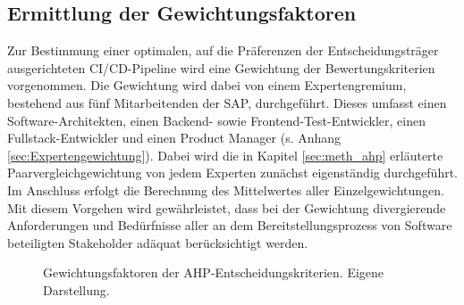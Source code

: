 \subsection{Ermittlung der Gewichtungsfaktoren}
\label{sec:Gewichtung}
Zur Bestimmung einer optimalen, auf die Präferenzen der Entscheidungsträger ausgerichteten CI/CD-Pipeline wird eine Gewichtung der Bewertungskriterien vorgenommen. Die Gewichtung wird dabei von einem Expertengremium, bestehend aus fünf Mitarbeitenden der SAP, durchgeführt. Dieses umfasst einen Software-Architekten, einen Backend- sowie Frontend-Test-Entwickler, einen Fullstack-Entwickler und einen Product Manager (s. Anhang \ref{sec:Expertengewichtung}). Dabei wird die in Kapitel \ref{sec:meth_ahp} erläuterte Paarvergleichgewichtung von jedem Experten zunächst eigenständig durchgeführt. Im Anschluss erfolgt die Berechnung des Mittelwertes aller Einzelgewichtungen. Mit diesem Vorgehen wird gewährleistet, dass bei der Gewichtung divergierende Anforderungen und Bedürfnisse aller an dem Bereitstellungsprozess von Software beteiligten Stakeholder adäquat berücksichtigt werden.   
\begin{center}
	\begin{figure}[H]
		\centering
		\caption[Gewichtungsfaktoren der AHP-Entscheidungskriterien]{Gewichtungsfaktoren der AHP-Entscheidungskriterien. Eigene Darstellung.}
		\label{fig:AHP_G}
	\end{figure}
\end{center}
\vspace*{-15mm}
